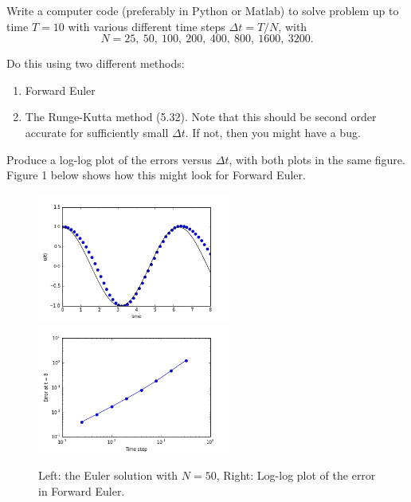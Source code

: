 \documentclass[10pt]{article}
\begin{document}
Write a computer code (preferably in Python or Matlab) to solve
problem  up to time $T=10$ with various different time
steps $\Delta t = T / N$, with
\[
N = 25,~ 50,~ 100,~ 200,~ 400,~ 800,~ 1600,~ 3200.
\]

Do this using two different methods:
\begin{enumerate} 
\item Forward Euler
\item The Runge-Kutta method (5.32).
Note that this should be second order accurate for sufficiently small
$\Delta t$.  If not, then you might have a bug.
\end{enumerate} 

Produce a log-log plot of the errors versus
$\Delta t$, with both plots in the same figure.   Figure 1 below shows how
this might look for Forward Euler. 


\begin{figure}[h]
\hfil\includegraphics[width=2.5in]{euler50.png}\hfil
\hfil\includegraphics[width=2.5in]{euler_errors.png}\hfil
\caption{\label{fig:plots1} 
Left: the Euler solution with $N=50$, Right: Log-log plot of the error in
Forward Euler.
  }
\end{figure}



\end{document}
